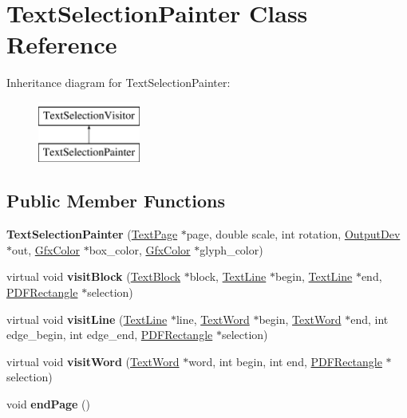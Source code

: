 \hypertarget{class_text_selection_painter}{}\section{Text\+Selection\+Painter Class Reference}
\label{class_text_selection_painter}
Inheritance diagram for Text\+Selection\+Painter\+:\begin{figure}[H]
\begin{center}
\leavevmode
\includegraphics[height=2.000000cm]{class_text_selection_painter}
\end{center}
\end{figure}
\subsection*{Public Member Functions}
\begin{DoxyCompactItemize}
\item 
\mbox{\label{class_text_selection_painter_a584527174dd124d6d41b82abcd3cca92}} 
{\bfseries Text\+Selection\+Painter} (\hyperlink{class_text_page}{Text\+Page} $\ast$page, double scale, int rotation, \hyperlink{class_output_dev}{Output\+Dev} $\ast$out, \hyperlink{struct_gfx_color}{Gfx\+Color} $\ast$box\+\_\+color, \hyperlink{struct_gfx_color}{Gfx\+Color} $\ast$glyph\+\_\+color)
\item 
\mbox{\label{class_text_selection_painter_a31a3743fd93c360dc098b6cdb95623a6}} 
virtual void {\bfseries visit\+Block} (\hyperlink{class_text_block}{Text\+Block} $\ast$block, \hyperlink{class_text_line}{Text\+Line} $\ast$begin, \hyperlink{class_text_line}{Text\+Line} $\ast$end, \hyperlink{class_p_d_f_rectangle}{P\+D\+F\+Rectangle} $\ast$selection)
\item 
\mbox{\label{class_text_selection_painter_a9162c5f0ffabc9f72a9208c784ae0843}} 
virtual void {\bfseries visit\+Line} (\hyperlink{class_text_line}{Text\+Line} $\ast$line, \hyperlink{class_text_word}{Text\+Word} $\ast$begin, \hyperlink{class_text_word}{Text\+Word} $\ast$end, int edge\+\_\+begin, int edge\+\_\+end, \hyperlink{class_p_d_f_rectangle}{P\+D\+F\+Rectangle} $\ast$selection)
\item 
\mbox{\label{class_text_selection_painter_a50e0481bb2cd3e2e2b5016b7d55261d2}} 
virtual void {\bfseries visit\+Word} (\hyperlink{class_text_word}{Text\+Word} $\ast$word, int begin, int end, \hyperlink{class_p_d_f_rectangle}{P\+D\+F\+Rectangle} $\ast$selection)
\item 
\mbox{\label{class_text_selection_painter_a9d4125b49c67fd39dfcbc0e21b433f69}} 
void {\bfseries end\+Page} ()
\end{DoxyCompactItemize}
